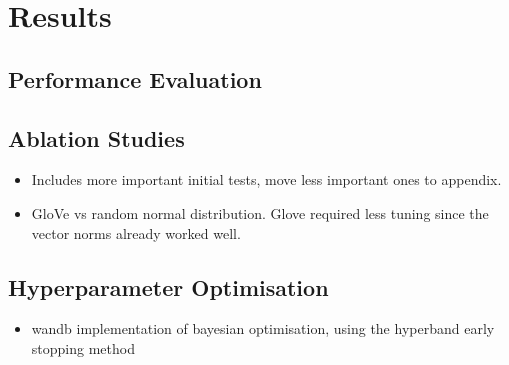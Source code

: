 \chapter{Results}

\section{Performance Evaluation}

\section{Ablation Studies}
\label{sec:ablation_studies}

\begin{itemize}
    \item Includes more important initial tests, move less important ones to appendix.
\end{itemize}

\begin{itemize}
    \item GloVe vs random normal distribution. Glove required less tuning since the vector norms already worked well.
\end{itemize}

\section{Hyperparameter Optimisation}

{\color{red}
  \begin{itemize}
    \item wandb \cite{wandb} implementation of bayesian optimisation, using the hyperband early stopping method
  \end{itemize}
}


